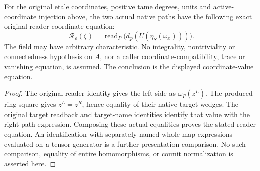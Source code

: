 \begin{theorem}
\label{thm:kn-mixed-native-original-coordinate-equation}
\leanok
For the original etale coordinates, positive tame degrees, units and
active-coordinate injection above, the two actual native paths have
the following exact original-reader coordinate equation:
\[
 \mathcal R_\rho(\zeta)
 =\operatorname{read}_P\bigl(d_p(U(\eta_S(\omega_x)))\bigr).
\]
The field may have arbitrary characteristic. No integrality,
nontriviality or connectedness hypothesis on $A$, nor a caller
coordinate-compatibility, trace or vanishing equation, is assumed.
The conclusion is the displayed coordinate-value equation.
\end{theorem}
\begin{proof}
The original-reader identity gives the left side as $\omega_P(z^L)$.
The produced ring square gives $z^L=z^R$, hence equality of their
native target wedges. The original target readback and target-name
identities identify that value with the right-path expression.
Composing these actual equalities proves the stated reader equation.
An identification with separately named whole-map expressions evaluated
on a tensor generator is a further presentation comparison. No such
comparison, equality of entire homomorphisms, or counit normalization is
asserted here.
\end{proof}
